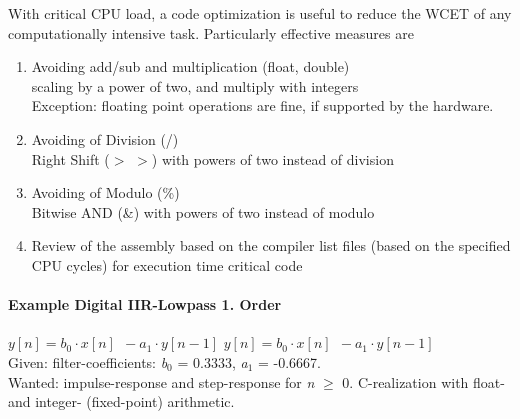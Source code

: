 With critical CPU load, a code optimization is useful to reduce the WCET of any computationally intensive task. Particularly effective measures are\\

\begin{enumerate}

\item  Avoiding add/sub and multiplication (float, double) \\scaling by a power of two, and multiply with integers \\ Exception: floating point operations are fine, if supported by the hardware.

\item  Avoiding of Division (/)\\ Right Shift ($\mathrm{>}$ $\mathrm{>}$) with powers of two instead of division

\item  Avoiding of Modulo (\%) \\ Bitwise AND (\&) with powers of two instead of modulo

\item  Review of the assembly based on the compiler list files (based on the specified CPU cycles) for execution time critical code
\end{enumerate}

\paragraph{  Example Digital IIR-Lowpass 1. Order }

$y[n]=b_{0} \cdot x[n]\; \, -a_{1} \cdot y[n-1]$ $y[n]=b_{0} \cdot x[n]\; \, -a_{1} \cdot y[n-1]$ \\

Given:   filter-coefficients: \textit{b}${}_{0}$ = 0.3333, \textit{a}${}_{1}$ = -0.6667. \\
Wanted:  impulse-response and step-response for \textit{n} $\mathrm{\ge}$ 0.     C-realization with float- and integer- (fixed-point) arithmetic.

